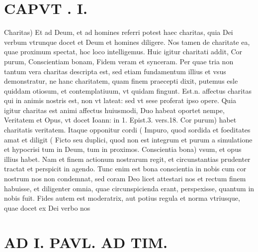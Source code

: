 \documentclass{article}
\begin{document}
\begin{pages}
\section*{CAPVT . I. }
\marginpar{[ p.15 ]}\pstart Charitas) Et ad Deum, et ad homines referri potest haec charitas, quia Dei verbum vtrunque docet et Deum et homines diligere. Nos tamen de charitate ea, quae proximum spectat, hoc loco intelligemus. Huic igitur charitati addit, Cor purum, Conscientiam bonam, Fidem veram et synceram. Per quae tria non tantum vera charitas descripta est, sed etiam fundamentum illius et vsus demonstratur, ne hanc charitatem, quam finem praecepti dixit, putemus esle quiddam otiosum, et contemplatiuum, vt quidam fingunt. Est.n. affectus charitas qui in animis nostris est, non vt lateat: sed vt sese proferat ipso opere. Quia igitur charitas est animi affectus huiusmodi, Duo habeat oportet nempe, Veritatem et Opus, vt docet Ioann: in 1. Epist.3. vers.18. Cor purum) habet charitatis veritatem. Itaque opponitur cordi ( Impuro, quod sordida et foeditates amat et diligit ( Ficto seu duplici, quod non est integrum et purum a simulatione et hypocrisi tum in Deum, tum in proximos. Conscientia bona) vsum, et opus illius habet. Nam et finem actionum nostrarum regit, et circunstantias prudenter tractat et perspicit in agendo. Tunc enim est bona conscientia in nobis cum cor nostrum nos non condemnat, sed coram Deo licet attestari nos et rectum finem habuisse, et diligenter omnia, quae circunspicienda erant, perspexisse, quantum in nobis fuit. Fides autem est moderatrix, aut potius regula et norma vtriusque, quae docet ex Dei verbo nos  \pend
\section*{AD I. PAVL. AD TIM. }
\marginpar{[ p.16 ]}\pstart {}
{}

\end{pages}
\end{document}

